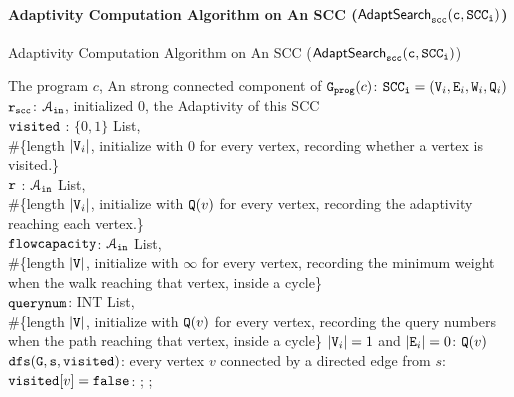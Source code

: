 \paragraph*{Adaptivity Computation Algorithm on An SCC ($\mathtt{\mathsf{AdaptSearch}_{scc}(c, SCC_i)}$)}
\begin{algorithm}
  \caption{
  {Adaptivity Computation Algorithm on An SCC ({$\mathtt{\mathsf{AdaptSearch}_{scc}(c, SCC_i)}$})}
  \label{alg:adaptscc}
  }
  \begin{algorithmic}[1]
    \REQUIRE The program $c$, 
    An strong connected component of $\mathtt{{G_{prog}}}(c)$: $ \mathtt{SCC_i} = (\mathtt{V}_i, \mathtt{E}_i, \mathtt{W}_i, \mathtt{Q}_i)$
  \\
  $\mathtt{r_{scc}}$: $\mathcal{A}_{\mathtt{in}}$, initialized $0$, the Adaptivity of this SCC
  \STATE {} 
  \\ \qquad  $\mathtt{visited}$ : $\{0, 1\}$ List, 
  \\ \qquad  \#\{length $|\mathtt{V}_i|$, initialize with $0$ for every vertex, recording whether a vertex is visited.\}
  \\ \qquad  $\mathtt{r}$ : $\mathcal{A}_{\mathtt{in}}$ List, 
  \\ \qquad  \#\{length $|\mathtt{V}_i|$, initialize with $\mathtt{Q}(v)$ for every vertex, recording the adaptivity reaching each vertex.\}
  \\ \qquad  $\mathtt{flowcapacity}$: $\mathcal{A}_{\mathtt{in}}$ List, 
  \\ \qquad  \#\{length $|\mathtt{V}|$, initialize with $\infty$ for every vertex,
  recording the minimum weight when the walk reaching 
  that vertex, inside a cycle\}
  \\ \qquad  $\mathtt{querynum}$: INT List,
  \\ \qquad  \#\{length $|\mathtt{V}|$, initialize with $\mathtt{Q}(v)$ for every vertex, 
  recording the query numbers when the path reaching 
  that vertex, inside a cycle\}
   $|\mathtt{V}_i| = 1$ and $|\mathtt{E}_i| = 0$:
  \STATE {}  $\mathtt{Q}(v)$
   {$\mathtt{dfs(G,s,visited)}$}:
  \STATE {} every vertex $v$ 
  connected by a directed edge from $s$:
  \STATE \qquad {} $\mathtt{visited}[v] = \mathtt{false}$:
  \STATE \qquad \qquad \qquad {};
  \STATE \qquad \qquad \qquad {};

\end{algorithmic}
\end{algorithm}
